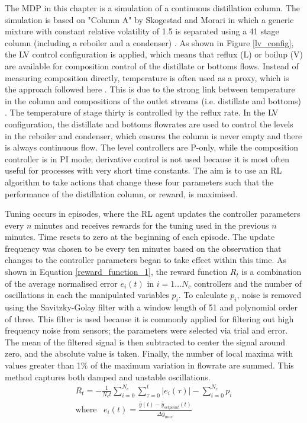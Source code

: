The MDP in this chapter is a simulation of a continuous  distillation column. The simulation is based on "Column A" by Skogestad and Morari in which a generic mixture with constant relative volatility of 1.5 is separated using a 41 stage column (including a reboiler and a condenser) \cite{Skogestad1988}. As shown in Figure \ref{lv_config}, the LV control configuration is applied, which means that reflux (L) or boilup (V) are available for composition control of the distillate or bottoms flows. Instead of measuring composition directly, temperature is often used as a proxy, which is the approach followed here \cite{Wolff1996, Luyben2006}. This is due to the strong link between temperature in the column and compositions of the outlet streams (i.e. distillate and bottoms) \cite{Luyben2006}. The temperature of stage thirty is controlled by the reflux rate. In the LV configuration, the distillate and bottoms flowrates are used to control the levels in the reboiler and condenser, which ensures the column is never empty and there is always continuous flow.  The level controllers are P-only, while the composition controller is in PI mode; derivative control is not used because it is most often useful for processes with very short time constants. The aim is to use an RL algorithm to take actions that change these four parameters such that the performance of the distillation column, or reward, is maximised.

Tuning occurs in episodes, where the RL agent updates the controller parameters every $n$ minutes and receives rewards for the tuning used in the previous $n$ minutes. Time resets to zero at the beginning of each episode. The update frequency was chosen to be every ten minutes based on the observation that changes to the controller parameters began to take effect within this time. As shown in Equation \ref{reward_function_1}, the reward function $R_t$ is a combination of the average normalised error $e_i(t)$ in $i=1 \dots N_c$ controllers and the number of oscillations in each the manipulated variables $p_i$. To calculate $p_i$, noise is removed using the Savitzky-Golay filter with a window length of 51 and polynomial order of three. This filter is used because it is commonly applied for filtering out high frequency noise from sensors; the parameters were selected via trial and error. The mean of the filtered signal is then subtracted to center the signal around zero, and the absolute value is taken. Finally, the number of local maxima with values greater than 1\% of the maximum variation in flowrate are summed. This method captures both damped and unstable oscillations.
\begin{gather}
	\label{reward_function_1}	
 	R_t = - \frac{1}{N_c t}\sum_{i=0}^{N_c}\sum_{\tau=0}^t \lvert e_i(\tau) \rvert  - \sum_{i=0}^{N_c}p_i\\[2em]
 	\label{reward_function_2}	
	\text{where}\;\;\; 	e_i(t) = \frac{\hat y(t) - \hat y_{setpoint}(t)}{\Delta \hat y_{max}}
\end{gather}

